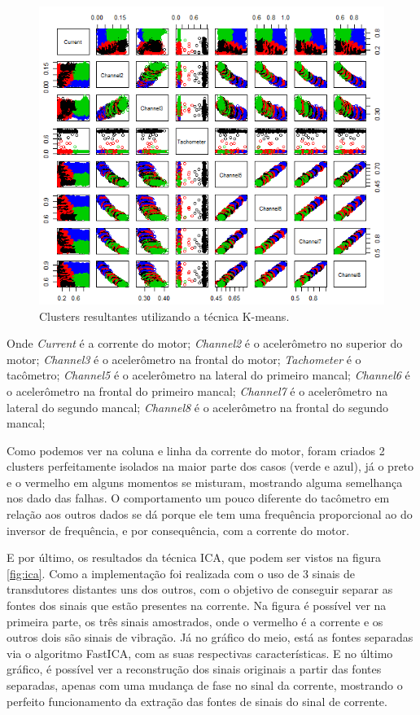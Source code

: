 \begin{figure}[H]
    \caption{Clusters resultantes utilizando a técnica K-means.}
    \begin{center}
        \includegraphics[scale=.65]{resultados/img/kmeans2.png}
    \end{center}
    \label{fig:kmeans2}
\end{figure}

Onde \textit{Current} é a corrente do motor; \textit{Channel2} é o acelerômetro no superior do motor; \textit{Channel3} é o acelerômetro na
frontal do motor; \textit{Tachometer} é o tacômetro; \textit{Channel5} é o acelerômetro na lateral do primeiro mancal; \textit{Channel6} 
é o acelerômetro na frontal do primeiro mancal; \textit{Channel7} é o acelerômetro na lateral do segundo mancal; \textit{Channel8} 
é o acelerômetro na frontal do segundo mancal;


Como podemos ver na coluna e linha da corrente do motor, foram criados 2 clusters perfeitamente isolados na maior parte dos
casos (verde e azul), já o preto e o vermelho em alguns momentos se misturam, mostrando alguma semelhança nos dado das falhas. 
O comportamento um pouco diferente do tacômetro em relação aos outros dados se dá porque ele tem uma frequência proporcional ao do 
inversor de frequência, e por consequência, com a corrente do motor.

E por último, os resultados da técnica ICA, que podem ser vistos na figura \ref{fig:ica}. Como a implementação foi realizada com o uso
de 3 sinais de transdutores distantes uns dos outros, com o objetivo de conseguir separar as fontes dos sinais que estão presentes na
corrente. Na figura é possível ver na primeira parte, os três sinais amostrados, onde o vermelho é a corrente e os outros dois são sinais
de vibração. Já no gráfico do meio, está as fontes separadas via o algoritmo FastICA, com as suas respectivas características. E no último
gráfico, é possível ver a reconstrução dos sinais originais a partir das fontes separadas, apenas com uma mudança de fase no sinal da
corrente, mostrando o perfeito funcionamento da extração das fontes de sinais do sinal de corrente.

